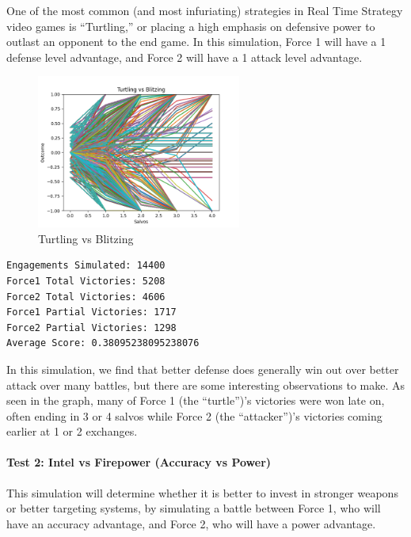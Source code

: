 One of the most common (and most infuriating) strategies in Real Time
Strategy video games is ``Turtling,'' or placing a high emphasis on
defensive power to outlast an opponent to the end game. In this
simulation, Force 1 will have a 1 defense level advantage, and Force 2
will have a 1 attack level advantage.

\begin{figure}
\hypertarget{fig:refname}{%
\centering
\includegraphics[width=0.6\textwidth,height=\textheight]{figures/turtle.png}
\caption{Turtling vs Blitzing}\label{fig:refname}
}
\end{figure}

\begin{verbatim}
Engagements Simulated: 14400
Force1 Total Victories: 5208
Force2 Total Victories: 4606
Force1 Partial Victories: 1717
Force2 Partial Victories: 1298
Average Score: 0.38095238095238076
\end{verbatim}

In this simulation, we find that better defense does generally win out
over better attack over many battles, but there are some interesting
observations to make. As seen in the graph, many of Force 1 (the
``turtle'')'s victories were won late on, often ending in 3 or 4 salvos
while Force 2 (the ``attacker'')'s victories coming earlier at 1 or 2
exchanges.

\hypertarget{test-2-intel-vs-firepower-accuracy-vs-power}{%
\paragraph{Test 2: Intel vs Firepower (Accuracy vs
Power)}\label{test-2-intel-vs-firepower-accuracy-vs-power}}

This simulation will determine whether it is better to invest in
stronger weapons or better targeting systems, by simulating a battle
between Force 1, who will have an accuracy advantage, and Force 2, who
will have a power advantage.

